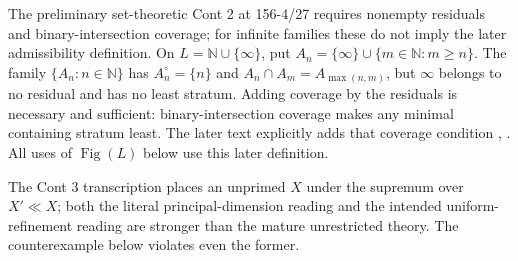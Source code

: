 \begin{counterexample}
\label{SA21-B-preliminary-admissibility}
The preliminary set-theoretic Cont 2 at 156-4/27 requires nonempty
residuals and binary-intersection coverage; for infinite families
these do not imply the later admissibility definition. On
\(L=\mathbb N\cup\{\infty\}\), put
\(A_n=\{\infty\}\cup\{m\in\mathbb N:m\geq n\}\).
The family \(\{A_n:n\in\mathbb N\}\) has
\(A_n^\circ=\{n\}\) and
\(A_n\cap A_m=A_{\max(n,m)}\), but \(\infty\) belongs to no
residual and has no least stratum. Adding coverage by the residuals
is necessary and sufficient: binary-intersection coverage makes
any minimal containing stratum least. The later text explicitly
adds that coverage condition
\citep[156-5, scans 2--5]{Grothendieck1986},
.
All uses of \(\operatorname{Fig}(L)\) below use this later definition.
\end{counterexample}

The Cont 3 transcription places an
unprimed \(X\) under the supremum over \(X'\ll X\); both the literal
principal-dimension reading and the intended uniform-refinement
reading are stronger than the mature unrestricted theory. The
counterexample below violates even the former.

